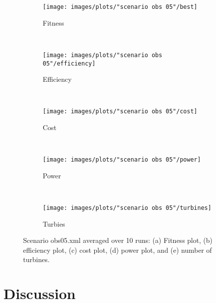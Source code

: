 \begin{figure}[h!]
    \centering
      \begin{subfigure}[b]{0.31\textwidth}
        \texttt{[image: images/plots/"scenario obs 05"/best]}
        \caption{Fitness}
        \hfill
        \label{plot:master slave model fitness plot scenario obs 05}
    \end{subfigure}
    ~
      \begin{subfigure}[b]{0.31\textwidth}
        \texttt{[image: images/plots/"scenario obs 05"/efficiency]}
        \caption{Efficiency}
        \hfill
        \label{plot:single point crossover}
    \end{subfigure}
    ~
    \begin{subfigure}[b]{0.31\textwidth}
        \texttt{[image: images/plots/"scenario obs 05"/cost]}
        \caption{Cost}
        \hfill
        \label{plot:single point crossover}
    \end{subfigure}
    ~
    \begin{subfigure}[b]{0.31\textwidth}
        \texttt{[image: images/plots/"scenario obs 05"/power]}
        \caption{Power}
        \hfill
        \label{plot:two point crossover}
    \end{subfigure}
    ~
    \begin{subfigure}[b]{0.31\textwidth}
        \texttt{[image: images/plots/"scenario obs 05"/turbines]}
        \caption{Turbies}
        \hfill
        \label{plot:uniform crossover}
    \end{subfigure}
    \caption{Scenario obs05.xml averaged over 10 runs: (a) Fitness plot, (b) efficiency plot, (c) cost plot, (d) power plot, and (e) number of turbines.}
    \label{plot:master slave scenario obs 05}
\end{figure}


\section{Discussion}\label{section:discussion}